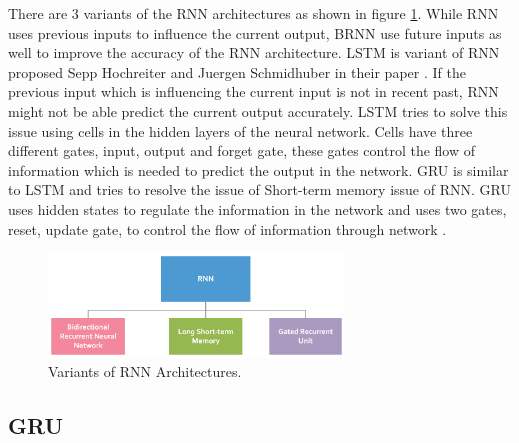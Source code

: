 \documentclass[twoside,11pt,a4paper]{article}
\begin{document}
\FloatBarrier
There are 3 variants of the \acs{RNN} architectures as shown in figure \ref{fig:various_rnn}. While \acs{RNN} uses previous inputs to influence the current output, \acs{BRNN} use future inputs as well to improve the accuracy of the \acs{RNN} architecture. \acf{LSTM} is variant of \acs{RNN} proposed Sepp Hochreiter and Juergen Schmidhuber in their paper \citep{hochreiter1997long}. If the previous input which is influencing the current input is not in recent past, \acs{RNN} might not be able predict the current output accurately. \acs{LSTM} tries to solve this issue using cells in the hidden layers of the neural network. Cells have three different gates, input, output and forget gate, these gates control the flow of information which is needed to predict the output in the network. \acf{GRU} is similar to \acs{LSTM} and tries to resolve the issue of Short-term memory issue of \acs{RNN}. \acs{GRU} uses hidden states to regulate the information in the network and uses two gates, reset, update gate, to control the flow of information through network \citep{cho2014learning}.\\
\begin{figure}[ht]
	\centering
	\includegraphics[width=0.7\textwidth]{various_rnn}
	\caption[Variants of \acs{RNN} Architectures]{Variants of \acs{RNN} Architectures.}
	\label{fig:various_rnn}
\end{figure}
\FloatBarrier
\subsection{\acf{GRU}}
\end{document}
